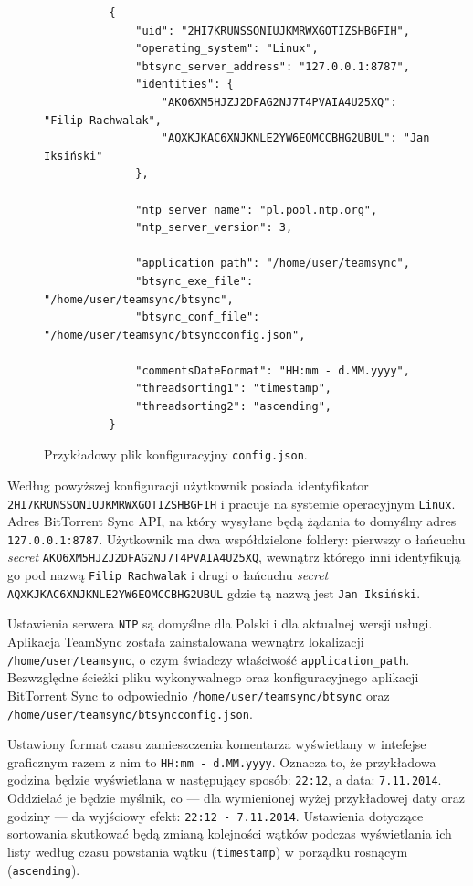 \documentclass[polish,a4paper,twoside]{ppfcmthesis}
\begin{document}
\begin{figure}[htb]
  \begin{verbatim}
          {
              "uid": "2HI7KRUNSSONIUJKMRWXGOTIZSHBGFIH",
              "operating_system": "Linux", 
              "btsync_server_address": "127.0.0.1:8787", 
              "identities": {
                  "AKO6XM5HJZJ2DFAG2NJ7T4PVAIA4U25XQ": "Filip Rachwalak", 
                  "AQXKJKAC6XNJKNLE2YW6EOMCCBHG2UBUL": "Jan Iksiński"
              }, 
    
              "ntp_server_name": "pl.pool.ntp.org", 
              "ntp_server_version": 3, 

              "application_path": "/home/user/teamsync",           
              "btsync_exe_file": "/home/user/teamsync/btsync",
              "btsync_conf_file": "/home/user/teamsync/btsyncconfig.json",

              "commentsDateFormat": "HH:mm - d.MM.yyyy", 
              "threadsorting1": "timestamp", 
              "threadsorting2": "ascending", 
          }
  \end{verbatim}
  \caption{Przykładowy plik konfiguracyjny \texttt{config.json}.}
\end{figure}

Według powyższej konfiguracji użytkownik posiada identyfikator \texttt{2HI7KRUN\-SSONIUJKM\-RWXGOTIZ\-SHBGFIH} i pracuje na systemie operacyjnym \texttt{Linux}. Adres BitTorrent Sync API, na który wysyłane będą żądania to domyślny adres \texttt{127.0.0.1:8787}. Użytkownik ma dwa współdzielone foldery: pierwszy o łańcuchu \emph{secret} \texttt{AKO6XM5H\-JZJ2DFAG2\-NJ7T4PVAI\-A4U25XQ}, wewnątrz którego inni identyfikują go pod nazwą \texttt{Filip \-Rachwalak} i drugi o łańcuchu \emph{secret} \texttt{AQXKJKAC\-6XNJKNLE2\-YW6EOMCC\-BHG2UBUL} gdzie tą nazwą jest \texttt{Jan \-Iksiński}.

Ustawienia serwera \texttt{NTP} są domyślne dla Polski i dla aktualnej wersji usługi. Aplikacja TeamSync została zainstalowana wewnątrz lokalizacji \texttt{/home\-/user\-/teamsync}, o czym świadczy właściwość \texttt{application\_\-path}. Bezwzględne ścieżki pliku wykonywalnego oraz konfiguracyjnego aplikacji BitTorrent Sync to odpowiednio \texttt{/home/user/\-teamsync/btsync} oraz \texttt{/home/user/\-teamsync/\-btsyncconfig.json}.

Ustawiony format czasu zamieszczenia komentarza wyświetlany w intefejse graficznym razem z nim to \texttt{HH:mm - d.MM.yyyy}. Oznacza to, że przykładowa godzina będzie wyświetlana w następujący sposób: \texttt{22:12}, a data: \texttt{7.11.2014}. Oddzielać je będzie myślnik, co --- dla wymienionej wyżej przykładowej daty oraz godziny --- da wyjściowy efekt: \texttt{22:12 - 7.11.2014}. Ustawienia dotyczące sortowania skutkować będą zmianą kolejności wątków podczas wyświetlania ich listy według czasu powstania wątku (\texttt{timestamp}) w porządku rosnącym (\texttt{ascending}).
\end{document}
